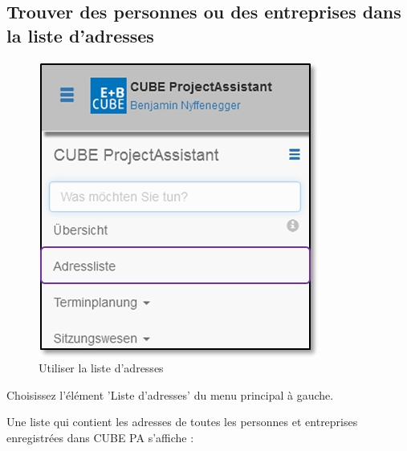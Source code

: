 \pagebreak
\subsection{Trouver des personnes ou des entreprises dans la liste d'adresses}

\begin{figure}   %
  \vspace{-35pt}      %
  \begin{center}
    \includegraphics[width=1\linewidth]{../chapters/03_Adressliste/pictures/3-1_Menu_Adressliste.jpg}
  \end{center}
  \vspace{-20pt}
  \caption{Utiliser la liste d'adresses}
  \vspace{-10pt}
\end{figure}

Choisissez l'élément 'Liste d'adresses' du menu principal à gauche.

\vspace{7cm}

Une liste qui contient les adresses de toutes les personnes et entreprises enregistrées dans CUBE PA s'affiche :

